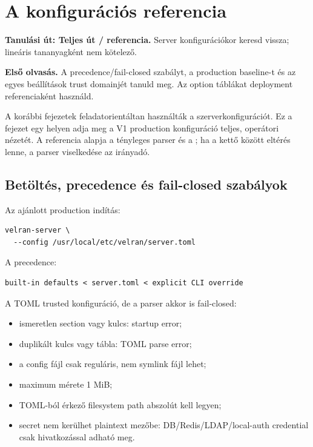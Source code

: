 \chapter{A  konfigurációs referencia}

\noindent\textbf{Tanulási út: Teljes út / referencia.} Server konfigurációkor keresd vissza; lineáris tananyagként nem kötelező.\par\medskip

\noindent\textbf{Első olvasás.} A precedence/fail-closed szabályt, a production baseline-t és az egyes beállítások trust domainjét tanuld meg. Az option táblákat deployment referenciaként használd.\par\medskip

A korábbi fejezetek feladatorientáltan használták a szerverkonfigurációt. Ez a fejezet egy helyen adja meg a V1 production konfiguráció teljes, operátori nézetét. A referencia alapja a tényleges parser és a ; ha a kettő között eltérés lenne, a parser viselkedése az irányadó.

\section{Betöltés, precedence és fail-closed szabályok}

Az ajánlott production indítás:

\begin{lstlisting}
velran-server \
  --config /usr/local/etc/velran/server.toml
\end{lstlisting}

A precedence:

\begin{lstlisting}
built-in defaults < server.toml < explicit CLI override
\end{lstlisting}

A TOML trusted konfiguráció, de a parser akkor is fail-closed:

\begin{itemize}
  \item ismeretlen section vagy kulcs: startup error;
  \item duplikált kulcs vagy tábla: TOML parse error;
  \item a config fájl csak reguláris, nem symlink fájl lehet;
  \item maximum mérete 1 MiB;
  \item TOML-ból érkező filesystem path abszolút kell legyen;
  \item secret nem kerülhet plaintext mezőbe: DB/Redis/LDAP/local-auth credential csak  hivatkozással adható meg.
\end{itemize}

